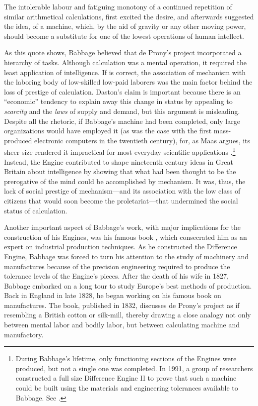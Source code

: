 \documentclass[version=last,draft=false,paper=A4,portrait,twoside=true,twocolumn=false,headinclude=false,footinclude=false,fontsize=12,BCOR=20mm,DIV=calc,pagesize=auto,titlepage=firstiscover,mpinclude=false,open=right,chapterprefix=true,numbers=autoendperiod,headsepline=false,headings=twolinechapter,parskip=false]{scrbook}
\begin{document}
\begin{displayquote}
The intolerable labour and fatiguing monotony of a continued repetition of
similar arithmetical calculations, first excited the desire, and afterwards
suggested the idea, of a machine, which, by the aid of gravity or any other
moving power, should become a substitute for one of the lowest operations
of human intellect.
\end{displayquote}

As this quote shows, Babbage believed that de Prony's project incorporated
a hierarchy of tasks. Although calculation was a mental operation, it
required the least application of intelligence. If \textcite{daston1994} is
correct, the association of mechanism with the laboring body of low-skilled
low-paid laborers was the main factor behind the loss of prestige of
calculation. Daston's claim is important because there is an ``economic''
tendency to explain away this change in status by appealing to \emph{scarcity} and
the \emph{laws} of supply and demand, but this argument is misleading. Despite all
the rhetoric, if Babbage's machine had been completed, only large
organizations would have employed it (as was the case with the first
mass-produced electronic computers in the twentieth century), for, as Maas
argues, its sheer size rendered it impractical for most everyday scientific
applications \autocite[103]{maas2005}.\footnote{During Babbage's lifetime, only functioning sections of the Engines
were produced, but not a single one was completed. In 1991, a group of
researchers constructed a full size Difference Engine II to prove that such
a machine could be built using the materials and engineering tolerances
available to Babbage. See \textcite{swade2000}.} Instead, the Engine
contributed to shape nineteenth century ideas in Great Britain about
intelligence by showing that what had been thought to be the prerogative of
the mind could be accomplished by mechanism. It was, thus, the lack of
social prestige of mechanism---and its association with the low class of
citizens that would soon become the proletariat---that undermined the
social status of calculation.

Another important aspect of Babbage's work, with major implications for the
construction of his Engines, was his famous book
, which consecrated him as an expert on
industrial production techniques. As he constructed the Difference Engine,
Babbage was forced to turn his attention to the study of machinery and
manufactures because of the precision engineering required to produce the
tolerance levels of the Engine's pieces. After the death of his wife in
1827, Babbage embarked on a long tour to study Europe's best methods of
production. Back in England in late 1828, he began working on his famous
book on manufactures. The book, published in 1832, discusses de Prony's
project as if resembling a British cotton or silk-mill, thereby drawing a
close analogy not only between mental labor and bodily labor, but between
calculating machine and manufactory.
\end{document}
